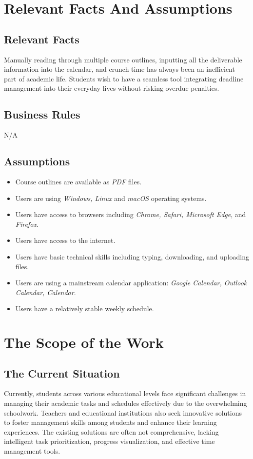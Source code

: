 \documentclass[12pt]{article}
\begin{document}
\section{Relevant Facts And Assumptions}
\subsection{Relevant Facts}
Manually reading through multiple course outlines, inputting all the deliverable information into the calendar, and crunch time has always been an inefficient part of academic life. Students wish to have a seamless tool integrating deadline management into their everyday lives without risking overdue penalties.
\subsection{Business Rules}
N/A
\subsection{Assumptions}
\begin{itemize}
    \item Course outlines are available as \textit{PDF} files.
    \item Users are using \textit{Windows, Linux} and \textit{macOS} operating systems.
    \item Users have access to browsers including \textit{Chrome, Safari, Microsoft Edge}, and \textit{Firefox}.
    \item Users have access to the internet.
    \item Users have basic technical skills including typing, downloading, and uploading files.
    \item Users are using a mainstream calendar application: \textit{Google Calendar, Outlook Calendar, Calendar}.
    \item Users have a relatively stable weekly schedule.
\end{itemize}


\section{The Scope of the Work}

\subsection{The Current Situation}
Currently, students across various educational levels face significant challenges in managing their academic tasks and schedules effectively due to the overwhelming schoolwork. Teachers and educational institutions also seek innovative solutions to foster management skills among students and enhance their learning experiences. The existing solutions are often not comprehensive, lacking intelligent task prioritization, progress visualization, and effective time management tools.
\end{document}
